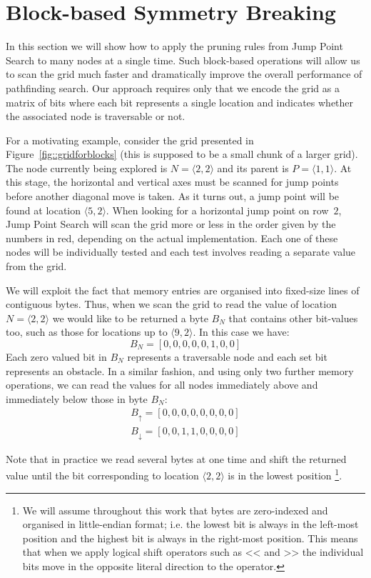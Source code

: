 \section{Block-based Symmetry Breaking}
\label{sec::blocks2}
In this section
we will show how to apply the pruning rules from Jump Point Search to many 
nodes at a single
time. Such block-based operations will allow us to scan the grid much faster
and dramatically improve the overall performance of pathfinding search.
Our approach requires only that we encode the grid as a matrix of bits where
each bit represents a single location and indicates whether the associated
node is traversable or not.

For a motivating example, consider the grid presented in 
Figure~\ref{fig::gridforblocks} 
(this is supposed to be a small chunk of a larger grid).  
The node currently being explored is $N = \langle 2,2\rangle$ 
and its parent is $P = \langle 1,1\rangle$.  
At this stage, the horizontal and vertical axes must be scanned 
for jump points before another diagonal move is taken.  
As it turns out, a jump point will be found at location $\langle 5,2\rangle$.  
When looking for a horizontal jump point on row~$2$, Jump Point Search will 
scan the grid more or less in the order given by the numbers in red, 
depending on the actual implementation.  
Each one of these nodes will be individually tested and each test
involves reading a separate value from the grid.

We will exploit the fact that memory entries are organised into fixed-size 
lines of contiguous bytes. Thus, when we scan the grid to read the value of 
location $N = \langle 2, 2\rangle$ we would like to be returned a byte $B_N$
that contains other bit-values too, such as those for locations up to
$\langle 9, 2\rangle$. In this case we have:
\begin{equation}
B_{N} = [0,0,0,0,0,1,0,0]
\end{equation}
Each zero valued bit in $B_N$ represents a traversable node and each set bit
represents an obstacle.
In a similar fashion, and using only two further memory operations, we can read the values for all nodes
immediately above and immediately below those in byte $B_N$:
\begin{gather}
B_{\uparrow} = [0, 0, 0, 0, 0, 0, 0, 0]\\
B_{\downarrow} = [0, 0, 1, 1, 0, 0, 0, 0]
\end{gather}

\noindent 
Note that in practice we read several bytes at one time and shift the returned
value until the bit corresponding to location $\langle 2, 2\rangle$ is in the
lowest position 
\footnote{We will assume throughout this work that bytes are zero-indexed and
organised in little-endian format; i.e. the lowest bit is always in the
left-most position and the highest bit is always in the right-most position.
This means that when we apply logical shift operators such as $\texttt{<<}$
and $\texttt{>>}$
the individual bits move in the opposite literal direction to the operator.}.

